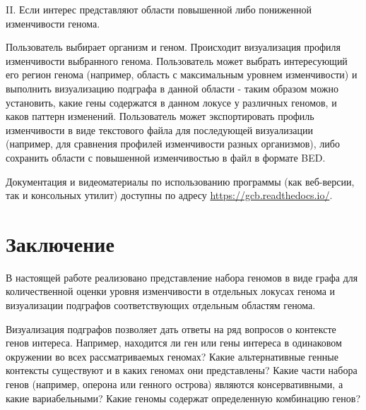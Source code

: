 II. Если интерес представляют области повышенной либо пониженной изменчивости генома.

Пользователь выбирает организм и геном. Происходит визуализация профиля изменчивости выбранного генома. Пользователь может выбрать интересующий его регион генома (например, область с максимальным уровнем изменчивости) и выполнить визуализацию подграфа в данной области - таким образом можно установить, какие гены содержатся в данном локусе у различных геномов, и каков паттерн изменений. Пользователь может экспортировать профиль изменчивости в виде текстового файла для последующей визуализации (например, для сравнения профилей изменчивости разных организмов), либо сохранить области с повышенной изменчивостью в файл в формате BED. 

Документация и видеоматериалы по использованию программы (как веб-версии, так и консольных утилит) доступны по адресу \url{https://gcb.readthedocs.io/}. 


\FloatBarrier
{}                                  %
\section*{Заключение}

В настоящей работе реализовано представление набора геномов в виде графа для количественной оценки уровня изменчивости в отдельных локусах генома и визуализации подграфов соответствующих отдельным областям генома. 

Визуализация подграфов позволяет дать ответы на ряд вопросов о контексте генов интереса. Например, находится ли ген или гены интереса в одинаковом окружении во всех рассматриваемых геномах? Какие альтернативные генные контексты существуют и в каких геномах они представлены? Какие части набора генов (например, оперона или генного острова) являются консервативными, а какие вариабельными? Какие геномы содержат определенную комбинацию генов? 

